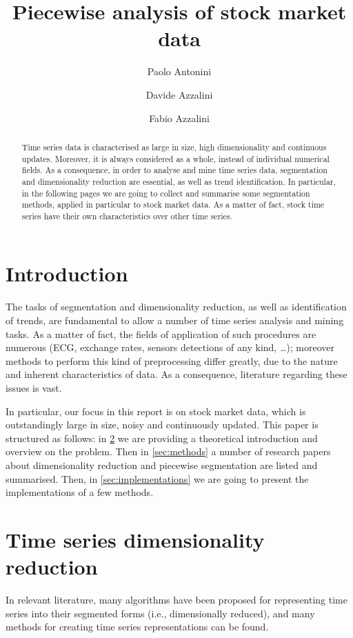 \documentclass[a4paper]{article}
\title{Piecewise analysis of stock market data}
\author{Paolo Antonini \and Davide Azzalini \and Fabio Azzalini}
\date{}
\begin{document}
\maketitle

\begin{abstract}
Time series data is characterised as large in size, high dimensionality and continuous updates. Moreover, it is always considered as a whole, instead of individual numerical fields. As a consequence, in order to analyse and mine time series data, segmentation and dimensionality reduction are essential, as well as trend identification. In particular, in the following pages we are going to collect and summarise some segmentation methods, applied in particular to stock market data. As a matter of fact, stock time series have their own characteristics over other time series. 
\end{abstract}




\section{Introduction}
The tasks of segmentation and dimensionality reduction, as well as identification of trends, are fundamental to allow a number of time series analysis and mining tasks. As a matter of fact, the fields of application of such procedures are numerous (ECG, exchange rates, sensors detections of any kind, \dots); moreover methods to perform this kind of preprocessing differ greatly, due to the nature and inherent characteristics of data. As a consequence, literature regarding these issues is vast. 

In particular, our focus in this report is on stock market data, which is outstandingly large in size, noisy and continuously updated. This paper is structured as follows: in \cref{sec:theory} we are providing a theoretical introduction and overview on the problem. Then in \cref{sec:methods} a number of research papers about dimensionality reduction and piecewise segmentation are listed and summarised. Then, in \cref{sec:implementations} we are going to present the implementations of a few methods. 



\section{Time series dimensionality reduction}\label{sec:theory}

In relevant literature, many algorithms have been proposed for representing time series into their segmented forms (i.e., dimensionally reduced), and many methods for creating time series representations can be found.
\end{document}
